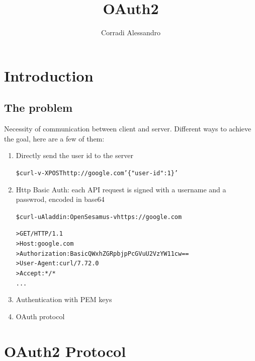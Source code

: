 \documentclass{style}
\title{OAuth2}
\author{Corradi Alessandro}
\begin{document}
\maketitle{}
\tableofcontents
\clearpage
{}

\section{Introduction}
\subsection{The problem}

Necessity of communication between client and server.
Different ways to achieve the goal, here are a few of them:
\begin{enumerate}
    \item Directly send the user id to the server
    \begin{alltt}
\$ curl -v -X POST http://google.com '\{"user-id": 1\}'
    \end{alltt}

    \item Http Basic Auth: each API request is signed with a username and a passwrod, encoded in base64
    \begin{alltt}
\$ curl -u Aladdin:OpenSesamus -v https://google.com

> GET / HTTP/1.1
> Host: google.com
> Authorization: Basic QWxhZGRpbjpPcGVuU2VzYW11cw==
> User-Agent: curl/7.72.0
> Accept: */*
...
    \end{alltt}

    \item Authentication with PEM keys
    \item OAuth protocol
\end{enumerate}


\section{OAuth2 Protocol}
\subsection{}
\end{document}
